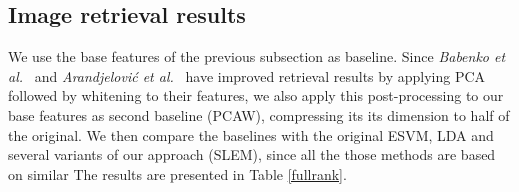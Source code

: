 



\subsection{Image retrieval results}
We use the base features of the previous subsection as baseline. Since \textit{Babenko et al.}~\cite{babenko15} and \textit{Arandjelovi\'c et al.}~\cite{Arandjelovic15} have improved retrieval results by applying PCA followed by whitening to their features, we also apply this post-processing to our base features as second baseline (PCAW), compressing its its dimension to half of the original. We then compare the baselines with the original ESVM, LDA and several variants of our approach (SLEM), since all the those methods are based on similar  The results are presented in Table \ref{fullrank}.

